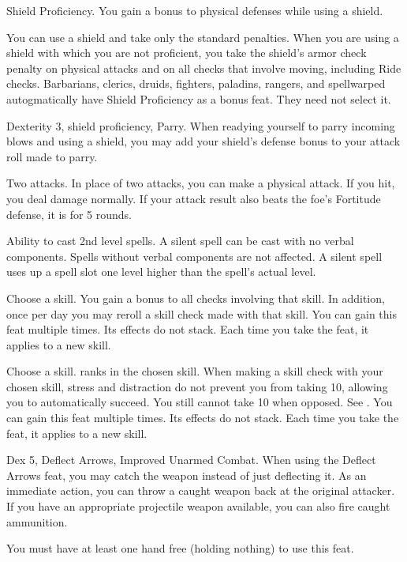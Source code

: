 \featpre Shield Proficiency.
\featben You gain a  bonus to physical defenses while using a shield.

\featben You can use a shield and take only the standard penalties.
When you are using a shield with which you are not proficient, you take the shield's armor check penalty on physical attacks and on all checks that involve moving, including Ride checks.
Barbarians, clerics, druids, fighters, paladins, rangers, and spellwarped autogmatically have Shield Proficiency as a bonus feat.
They need not select it.

\featpres Dexterity 3, shield proficiency, Parry.
\featben When readying yourself to parry incoming blows and using a shield, you may add your shield's defense bonus to your attack roll made to parry.

\featpre Two attacks.
\featben In place of two attacks, you can make a physical attack.
If you hit, you deal damage normally.
If your attack result also beats the foe's Fortitude defense, it is \staggered for 5 rounds.

\featpre Ability to cast 2nd level spells.
\featben A silent spell can be cast with no verbal components.
Spells without verbal components are not affected.
A silent spell uses up a spell slot one level higher than the spell's actual level.

Choose a skill.
\featben You gain a  bonus to all checks involving that skill.
In addition, once per day you may reroll a skill check made with that skill.
You can gain this feat multiple times.
Its effects do not stack.
Each time you take the feat, it applies to a new skill.

Choose a skill.
 ranks in the chosen skill.
\featben When making a skill check with your chosen skill, stress and distraction do not prevent you from taking 10, allowing you to automatically succeed.
You still cannot take 10 when opposed.
See .
You can gain this feat multiple times.
Its effects do not stack.
Each time you take the feat, it applies to a new skill.

\featpres
Dex 5, Deflect Arrows, Improved Unarmed Combat.
\featben When using the Deflect Arrows feat, you may catch the weapon instead of just deflecting it.
As an immediate action, you can throw a caught weapon back at the original attacker.
If you have an appropriate projectile weapon available, you can also fire caught ammunition.
\par You must have at least one hand free (holding nothing) to use this feat.

